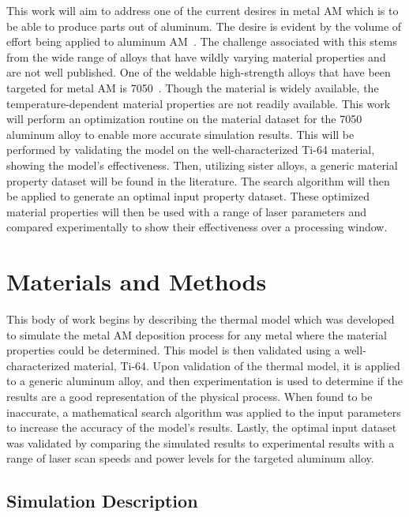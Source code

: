 \documentclass[metals,article,accept,pdftex,moreauthors]{Definitions/mdpi}
\begin{document}
This work will aim to address one of the current desires in metal \ac{AM} which is to be 
able to produce parts out of aluminum.  The desire is evident by the volume of effort being 
applied to aluminum \ac{AM}~\cite{qiHighStrengthLi2020, 
weissImprovedHighTemperatureAluminum2019, 
weissDevelopmentsAluminumScandiumCeramicAluminumScandiumCerium2019}.  The 
challenge associated with this stems from the wide range of alloys that have wildly 
varying material properties and are not well published.  One of the weldable high-strength 
alloys that have been targeted for metal \ac{AM} is 
7050~\cite{singhAdditiveManufacturing4047}.  Though the material is widely available, 
the temperature-dependent material properties are not readily available.  
This work will perform an optimization routine on the material dataset for the 7050 
aluminum alloy to enable more accurate simulation results.  This will be performed by 
validating the model on the well-characterized Ti-64 material, showing the model's 
effectiveness.  Then, utilizing sister alloys, a generic material property dataset will be 
found in the literature.  The search algorithm will then be applied to generate an optimal 
input property dataset.  These optimized material properties will then be used with a 
range of 
laser parameters and compared experimentally to show their effectiveness over a 
processing window.




\section{Materials and Methods}
\label{methodsOverview}

This body of work begins by describing the thermal model which was developed to 
simulate the metal \ac{AM} deposition process for any metal where the material 
properties could be determined.  This model is then validated using a well-characterized 
material, Ti-64.  Upon validation of the thermal model, it is applied to a generic aluminum 
alloy, and then experimentation is used to determine if the results are a good 
representation of the physical process.  When found to be inaccurate, a mathematical 
search algorithm was applied to the input parameters to increase the accuracy of the 
model's results.  Lastly, the optimal input dataset was validated by comparing the 
simulated results to experimental results with a range of laser scan speeds and power 
levels for the targeted aluminum alloy.

\subsection{Simulation Description}
\label{model_description}
\end{document}
